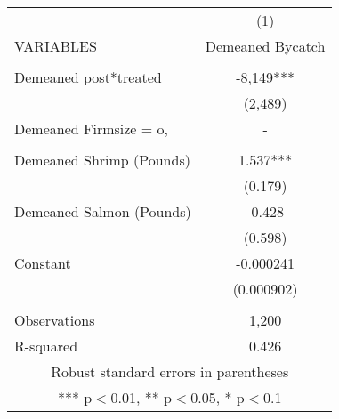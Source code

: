 \begin{tabular}{lc} \hline
 & (1) \\
VARIABLES & Demeaned Bycatch \\ \hline
 &  \\
Demeaned post*treated & -8,149*** \\
 & (2,489) \\
Demeaned Firmsize = o, & - \\
 &  \\
Demeaned Shrimp (Pounds) & 1.537*** \\
 & (0.179) \\
Demeaned Salmon (Pounds) & -0.428 \\
 & (0.598) \\
Constant & -0.000241 \\
 & (0.000902) \\
 &  \\
Observations & 1,200 \\
 R-squared & 0.426 \\ \hline
\multicolumn{2}{c}{ Robust standard errors in parentheses} \\
\multicolumn{2}{c}{ *** p$<$0.01, ** p$<$0.05, * p$<$0.1} \\
\end{tabular}
